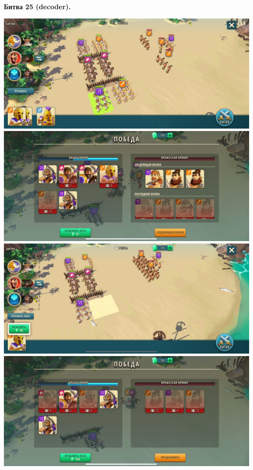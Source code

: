 \newpage
\begin{center}
	\hypertarget{fight25}{\textbf{Битва 25 (decoder).}}
\end{center}
\noindent\includegraphics[width=\linewidth]{./parts/media/TreasureHunt/25/decoder/photo_2022-04-13_16-38-30.jpg} \newline
\noindent\includegraphics[width=\linewidth]{./parts/media/TreasureHunt/25/decoder/photo_2022-04-13_16-38-45.jpg} \newline
\noindent\includegraphics[width=\linewidth]{./parts/media/TreasureHunt/25/decoder/photo_2022-04-13_16-38-53.jpg} \newline
\noindent\includegraphics[width=\linewidth]{./parts/media/TreasureHunt/25/decoder/photo_2022-04-13_16-38-58.jpg} \newline

